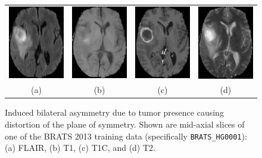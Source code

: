 \begin{figure}
  \centering
  \begin{tabular}{cccc}
  \includegraphics[width=28mm]{Fig1a.eps} &
  \includegraphics[width=28mm]{Fig1b.eps} &
  \includegraphics[width=28mm]{Fig1c.eps} &
  \includegraphics[width=28mm]{Fig1d.eps} \\
  (a) & (b) &
  (c) & (d) \\
  \end{tabular}
  \caption{Induced bilateral asymmetry due to tumor presence causing
  distortion of the plane of symmetry.  Shown are mid-axial slices of
  one of the BRATS 2013 training data 
  (specifically {\tt BRATS\_HG0001}):  (a) FLAIR, (b) T1, (c) T1C, and
  (d) T2.  }
  \label{fig:asymmetry}
\end{figure}

